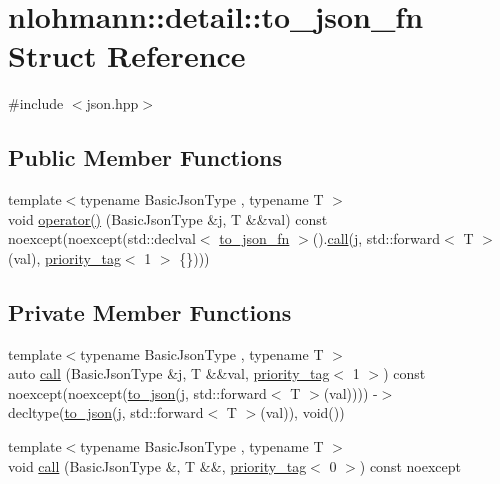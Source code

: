 \hypertarget{structnlohmann_1_1detail_1_1to__json__fn}{}\section{nlohmann\+:\+:detail\+:\+:to\+\_\+json\+\_\+fn Struct Reference}
\label{structnlohmann_1_1detail_1_1to__json__fn}


{\ttfamily \#include $<$json.\+hpp$>$}

\subsection*{Public Member Functions}
\begin{DoxyCompactItemize}
\item 
{\footnotesize template$<$typename Basic\+Json\+Type , typename T $>$ }\\void \hyperlink{structnlohmann_1_1detail_1_1to__json__fn_ac63f82d3eed085522f1cbe99a521a4d4}{operator()} (Basic\+Json\+Type \&j, T \&\&val) const noexcept(noexcept(std\+::declval$<$ \hyperlink{structnlohmann_1_1detail_1_1to__json__fn}{to\+\_\+json\+\_\+fn} $>$().\hyperlink{structnlohmann_1_1detail_1_1to__json__fn_ada2ce804ebf3b55f6e3e46ff3a055394}{call}(j, std\+::forward$<$ T $>$(val), \hyperlink{structnlohmann_1_1detail_1_1priority__tag}{priority\+\_\+tag}$<$ 1 $>$ \{\})))
\end{DoxyCompactItemize}
\subsection*{Private Member Functions}
\begin{DoxyCompactItemize}
\item 
{\footnotesize template$<$typename Basic\+Json\+Type , typename T $>$ }\\auto \hyperlink{structnlohmann_1_1detail_1_1to__json__fn_ada2ce804ebf3b55f6e3e46ff3a055394}{call} (Basic\+Json\+Type \&j, T \&\&val, \hyperlink{structnlohmann_1_1detail_1_1priority__tag}{priority\+\_\+tag}$<$ 1 $>$) const noexcept(noexcept(\hyperlink{namespacenlohmann_1_1detail_a1a804b98cbe89b7e44b698f2ca860490}{to\+\_\+json}(j, std\+::forward$<$ T $>$(val)))) -\/$>$ decltype(\hyperlink{namespacenlohmann_1_1detail_a1a804b98cbe89b7e44b698f2ca860490}{to\+\_\+json}(j, std\+::forward$<$ T $>$(val)), void())
\item 
{\footnotesize template$<$typename Basic\+Json\+Type , typename T $>$ }\\void \hyperlink{structnlohmann_1_1detail_1_1to__json__fn_adbd2247cecd3cdd072f9a28ef84e85f4}{call} (Basic\+Json\+Type \&, T \&\&, \hyperlink{structnlohmann_1_1detail_1_1priority__tag}{priority\+\_\+tag}$<$ 0 $>$) const noexcept
\end{DoxyCompactItemize}


